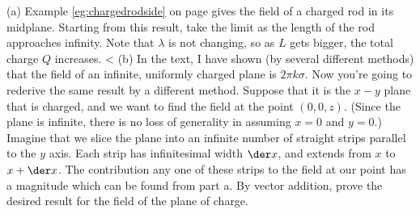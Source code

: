         (a) Example \ref{eg:chargedrodside} on page \pageref{eg:chargedrodside}
        gives the field of a charged rod in its midplane.
        Starting from this result, take the limit as the length of the rod approaches infinity.
        Note that $\lambda$ is not changing, so as $L$ gets bigger, the total charge $Q$ increases.
        <%
        (b) In the text, I have shown (by several different methods)
        that the field of an infinite,
        uniformly charged plane is $2\pi k\sigma$. Now you're going to
        rederive the same result by a different method.
        Suppose that it is the $x-y$ plane that is charged, and we
        want to find the field at the point $(0,0,z)$. (Since the plane
        is infinite, there is no loss of generality in assuming
        $x=0$ and $y=0$.)
        Imagine that we slice the plane into an infinite number of
        straight strips parallel to the $y$ axis.
        Each strip has infinitesimal width $\der x$, and extends
        from $x$ to $x+\der x$. The contribution any one of these
        strips to the field at our point has a magnitude which can
        be found from part a.
        By vector addition, prove the desired result for the field of
        the plane of charge. 

